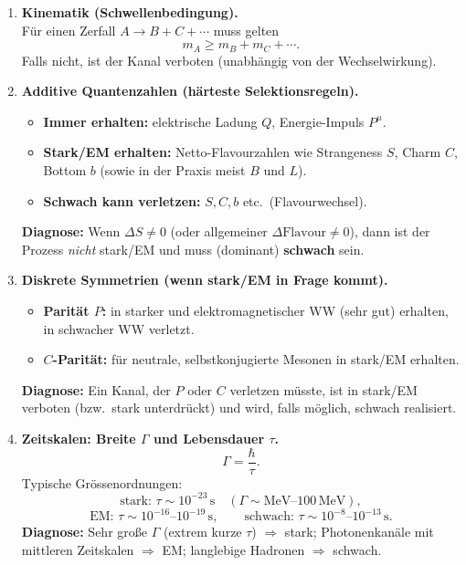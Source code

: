 \documentclass[10pt, letterpaper]{article}
\begin{document}
\begin{enumerate}
\item \textbf{Kinematik (Schwellenbedingung).}\\
Für einen Zerfall $A\to B+C+\cdots$ muss gelten
\[
m_A \ge m_B+m_C+\cdots.
\]
Falls nicht, ist der Kanal verboten (unabhängig von der Wechselwirkung).

\item \textbf{Additive Quantenzahlen (härteste Selektionsregeln).}\\
\begin{itemize}
\item \textbf{Immer erhalten:} elektrische Ladung $Q$, Energie-Impuls $P^\mu$.
\item \textbf{Stark/EM erhalten:} Netto-Flavourzahlen wie Strangeness $S$, Charm $C$, Bottom $b$
(sowie in der Praxis meist $B$ und $L$).
\item \textbf{Schwach kann verletzen:} $S,C,b$ etc.\ (Flavourwechsel).
\end{itemize}
\textbf{Diagnose:} Wenn $\Delta S\neq 0$ (oder allgemeiner $\Delta\text{Flavour}\neq 0$), dann
ist der Prozess \emph{nicht} stark/EM und muss (dominant) \textbf{schwach} sein.

\item \textbf{Diskrete Symmetrien (wenn stark/EM in Frage kommt).}\\
\begin{itemize}
\item \textbf{Parität $P$:} in starker und elektromagnetischer WW (sehr gut) erhalten,
in schwacher WW verletzt.
\item \textbf{$C$-Parität:} für neutrale, selbstkonjugierte Mesonen in stark/EM erhalten.
\end{itemize}
\textbf{Diagnose:} Ein Kanal, der $P$ oder $C$ verletzen müsste, ist in stark/EM verboten
(bzw.\ stark unterdrückt) und wird, falls möglich, schwach realisiert.

\item \textbf{Zeitskalen: Breite $\Gamma$ und Lebensdauer $\tau$.}\\
\[
\Gamma=\frac{\hbar}{\tau}.
\]
Typische Grössenordnungen:
\[
\text{stark: }\tau\sim 10^{-23}\,\mathrm{s}\quad (\Gamma\sim \mathrm{MeV}\text{--}100\,\mathrm{MeV}),
\]
\[
\text{EM: }\tau\sim 10^{-16}\text{--}10^{-19}\,\mathrm{s},
\qquad
\text{schwach: }\tau\sim 10^{-8}\text{--}10^{-13}\,\mathrm{s}.
\]
\textbf{Diagnose:} Sehr große $\Gamma$ (extrem kurze $\tau$) $\Rightarrow$ stark;
Photonenkanäle mit mittleren Zeitskalen $\Rightarrow$ EM;
langlebige Hadronen $\Rightarrow$ schwach.


\end{enumerate}
\end{document}
